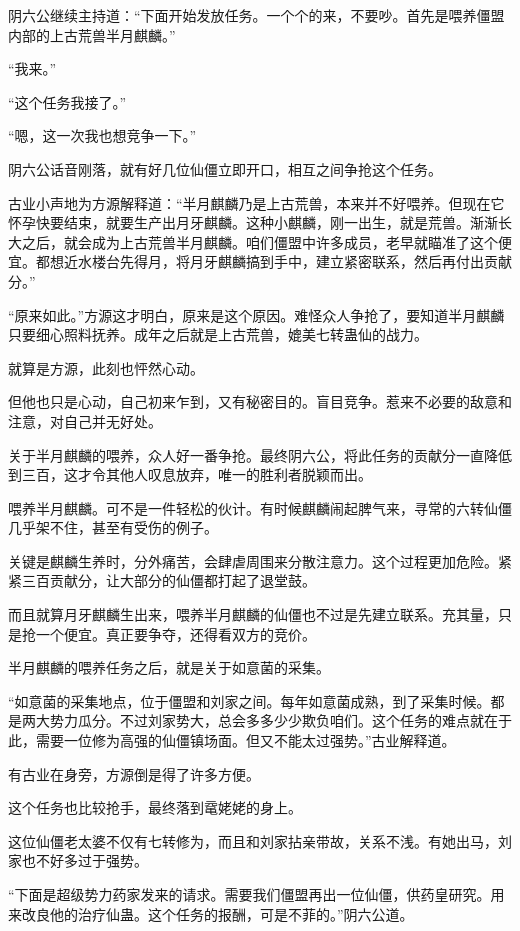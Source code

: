 \begin{this_body}
阴六公继续主持道：“下面开始发放任务。一个个的来，不要吵。首先是喂养僵盟内部的上古荒兽半月麒麟。”

“我来。”

“这个任务我接了。”

“嗯，这一次我也想竞争一下。”

阴六公话音刚落，就有好几位仙僵立即开口，相互之间争抢这个任务。

古业小声地为方源解释道：“半月麒麟乃是上古荒兽，本来并不好喂养。但现在它怀孕快要结束，就要生产出月牙麒麟。这种小麒麟，刚一出生，就是荒兽。渐渐长大之后，就会成为上古荒兽半月麒麟。咱们僵盟中许多成员，老早就瞄准了这个便宜。都想近水楼台先得月，将月牙麒麟搞到手中，建立紧密联系，然后再付出贡献分。”

“原来如此。”方源这才明白，原来是这个原因。难怪众人争抢了，要知道半月麒麟只要细心照料抚养。成年之后就是上古荒兽，媲美七转蛊仙的战力。

就算是方源，此刻也怦然心动。

但他也只是心动，自己初来乍到，又有秘密目的。盲目竞争。惹来不必要的敌意和注意，对自己并无好处。

关于半月麒麟的喂养，众人好一番争抢。最终阴六公，将此任务的贡献分一直降低到三百，这才令其他人叹息放弃，唯一的胜利者脱颖而出。

喂养半月麒麟。可不是一件轻松的伙计。有时候麒麟闹起脾气来，寻常的六转仙僵几乎架不住，甚至有受伤的例子。

关键是麒麟生养时，分外痛苦，会肆虐周围来分散注意力。这个过程更加危险。紧紧三百贡献分，让大部分的仙僵都打起了退堂鼓。

而且就算月牙麒麟生出来，喂养半月麒麟的仙僵也不过是先建立联系。充其量，只是抢一个便宜。真正要争夺，还得看双方的竞价。

半月麒麟的喂养任务之后，就是关于如意菌的采集。

“如意菌的采集地点，位于僵盟和刘家之间。每年如意菌成熟，到了采集时候。都是两大势力瓜分。不过刘家势大，总会多多少少欺负咱们。这个任务的难点就在于此，需要一位修为高强的仙僵镇场面。但又不能太过强势。”古业解释道。

有古业在身旁，方源倒是得了许多方便。

这个任务也比较抢手，最终落到鼋姥姥的身上。

这位仙僵老太婆不仅有七转修为，而且和刘家拈亲带故，关系不浅。有她出马，刘家也不好多过于强势。

“下面是超级势力药家发来的请求。需要我们僵盟再出一位仙僵，供药皇研究。用来改良他的治疗仙蛊。这个任务的报酬，可是不菲的。”阴六公道。


\end{this_body}

